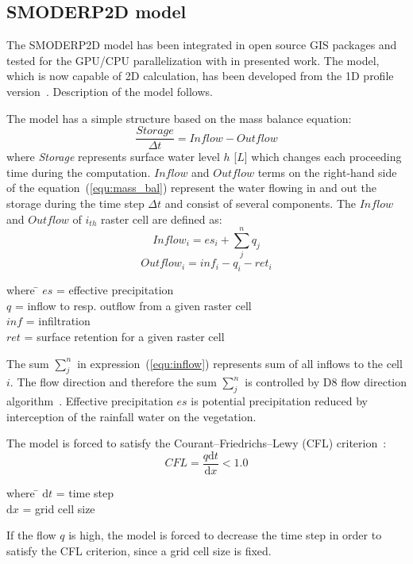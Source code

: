 \subsection{SMODERP2D model}
The SMODERP2D model has been integrated in open source 
GIS packages and tested for the GPU/CPU parallelization
with in presented work. The model, which is now capable of 2D
calculation, has been developed from the 1D profile version~\cite{Holy1984}. 
Description of the model follows.

The model has a simple structure based on the mass balance equation:
\begin{equation}\label{equ:mass_bal}
    \frac{Storage}{\Delta t} = \nonumber  
    Inflow - Outflow
\end{equation}
where {\it Storage} represents 
surface water level $h$ [$L$] which changes each proceeding time
during the computation. $Inflow$ and $Outflow$ terms on the right-hand side of
the equation~(\ref{equ:mass_bal}) represent the water flowing in and out the storage 
during the time step ${\Delta t}$ and consist of several components.
The $Inflow$ and $Outflow$ of $i_{th}$ raster cell are defined as:
\begin{equation}\label{equ:inflow}
    Inflow_i = es_{i} + \sum_j^n q_{j}
\end{equation}
\begin{equation}\label{equ:outflow}
    Outflow_i = inf_{i} - q_{i} - ret_i
\end{equation}
\begin{tabbing} 
where \hspace{0.6cm} \= $es$ = effective precipitation\\
\> $q$ = inflow to resp. outflow from a given raster cell\\
\> $inf$ = infiltration\\
\> $ret$ = surface retention for a given raster cell
\end{tabbing}
The sum $\sum_j^n$ in expression~(\ref{equ:inflow}) represents sum of all inflows to the cell $i$. 
The flow direction and therefore the sum $\sum_j^n$
is controlled by D8 flow direction algorithm~\cite{ocallaghan1984}.  Effective
precipitation $es$ is potential precipitation reduced by
interception of the rainfall water on the vegetation.

The model is forced to satisfy the Courant--Friedrichs--Lewy (CFL)
criterion~\cite{courant1928}:
\begin{equation}\label{equ:CFL}
    CFL = \frac{q\textrm{d}t}{\textrm{d}x} < 1.0
\end{equation}
\begin{tabbing} 
where \hspace{0.6cm} \= $\textrm{d}t$ = time step\\
\> $\textrm{d}x$ = grid cell size
\end{tabbing}
If the flow $q$ is high, the model is forced to decrease the
time step in order to satisfy the CFL criterion, since a grid cell size
is fixed.

